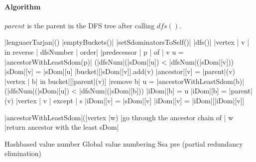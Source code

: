 \documentclass[a4paper,12pt, notitlepage]{article}
\newcommand{\negv}{\vspace{-0.7cm}}
\begin{document}
\paragraph*{Algorithm}
$parent$ is the parent in the DFS tree after calling $dfs()$.
\begin{program}
\PROC |lenguaerTarjan|() \BODY
    |emptyBuckets()|
    |setSdominatorsToSelf()|
    |dfs()|
    \FOREACH |vertex | v | in reverse | dfsNumber | order| \DO
        \FOREACH |predecessor | p | of | v \DO
            u = |ancestorWithLeastSdom(p)|
            \IF (|dfsNum|(|sDom|[u]) < |dfsNum|(|sDom|[v])) \AR*
                |sDom|[v] = |sDom|[u] 
            \FI
        \OD
        |bucket|[|sDom|[v]].add(v)
        |ancestor|[v] = |parent|(v) 
        \FOREACH |vertex | b| in bucket|[|parent|(v)] \DO
            |remove b|
            u = |ancestorWithLeastSdom(b)|
            \IF (|dfsNum|(|sDom|[u]) < |dfsNum|(|sDom|[b])) \AR*
                |iDom|[b] = u
            \ELSE
                |iDom|[b] = |parent|(v)
            \FI
        \OD
    \OD
    \FOREACH |vertex | v | except | s \DO
        \IF |iDom|[v] \not= |sDom|[v] \AR*
            |iDom|[v] = |iDom|[|iDom|[v]]
        \FI
    \OD
\end{program}
\negv
\begin{program}
\PROC |ancestorWithLeastSdom|(|vertex |w) \BODY
    |go through the ancestor chain of | w
    |return ancestor with the least sDom|
\end{program}


Hashbased value number
Global value numbering
Ssa pre (partial redundancy elimination)
\end{document}
